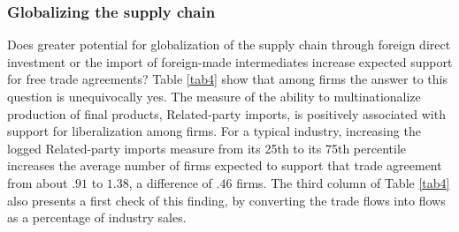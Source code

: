 \documentclass[hidelinks,12pt,letter]{article}
\begin{document}
\subsubsection*{Globalizing the supply chain}
Does greater potential for globalization of the supply chain through foreign direct investment or the import of foreign-made intermediates increase expected support for free trade agreements? Table \ref{tab4} show that among firms the answer to this question is unequivocally yes. The measure of the ability to multinationalize production of final products, Related-party imports, is positively associated with support for liberalization among firms. For a typical industry, increasing the logged Related-party imports measure from its 25th to its 75th percentile increases the average number of firms expected to support that trade agreement from about $.91$ to $1.38$, a difference of $.46$ firms. The third column of Table \ref{tab4} also presents a first check of this finding, by converting the trade flows into flows as a percentage of industry sales.%
\end{document}

